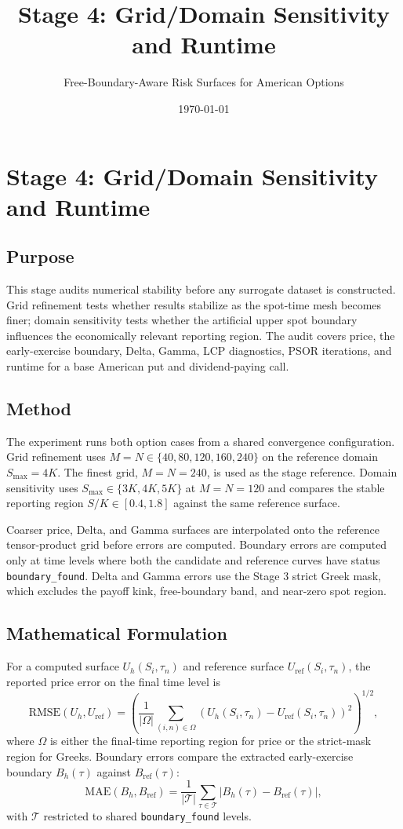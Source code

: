 \documentclass[11pt]{article}
\title{Stage 4: Grid/Domain Sensitivity and Runtime}
\author{Free-Boundary-Aware Risk Surfaces for American Options}
\date{\today}
\begin{document}
\maketitle

\section{Stage 4: Grid/Domain Sensitivity and Runtime}

\subsection{Purpose}
This stage audits numerical stability before any surrogate dataset is
constructed. Grid refinement tests whether results stabilize as the spot-time
mesh becomes finer; domain sensitivity tests whether the artificial upper spot
boundary influences the economically relevant reporting region. The audit
covers price, the early-exercise boundary, Delta, Gamma, LCP diagnostics, PSOR
iterations, and runtime for a base American put and dividend-paying call.

\subsection{Method}
The experiment runs both option cases from a shared convergence configuration. Grid refinement uses $M=N\in\{40,80,120,160,240\}$ on the reference domain $S_{\max}=4K$. The finest grid, $M=N=240$, is used as the stage reference. Domain sensitivity uses $S_{\max}\in\{3K,4K,5K\}$ at $M=N=120$ and compares the stable reporting region $S/K\in[0.4,1.8]$ against the same reference surface.

Coarser price, Delta, and Gamma surfaces are interpolated onto the reference tensor-product grid before errors are computed. Boundary errors are computed only at time levels where both the candidate and reference curves have status \texttt{boundary\_found}. Delta and Gamma errors use the Stage 3 strict Greek mask, which excludes the payoff kink, free-boundary band, and near-zero spot region.

\subsection{Mathematical Formulation}
For a computed surface $U_h(S_i,\tau_n)$ and reference surface $U_{\mathrm{ref}}(S_i,\tau_n)$, the reported price error on the final time level is
\[
\mathrm{RMSE}(U_h,U_{\mathrm{ref}})=
\left(\frac{1}{|\Omega|}\sum_{(i,n)\in\Omega}
\left(U_h(S_i,\tau_n)-U_{\mathrm{ref}}(S_i,\tau_n)\right)^2\right)^{1/2},
\]
where $\Omega$ is either the final-time reporting region for price or the strict-mask region for Greeks. Boundary errors compare the extracted early-exercise boundary $B_h(\tau)$ against $B_{\mathrm{ref}}(\tau)$:
\[
\mathrm{MAE}(B_h,B_{\mathrm{ref}})=
\frac{1}{|\mathcal{T}|}\sum_{\tau\in\mathcal{T}} |B_h(\tau)-B_{\mathrm{ref}}(\tau)|,
\]
with $\mathcal{T}$ restricted to shared \texttt{boundary\_found} levels.
\end{document}

